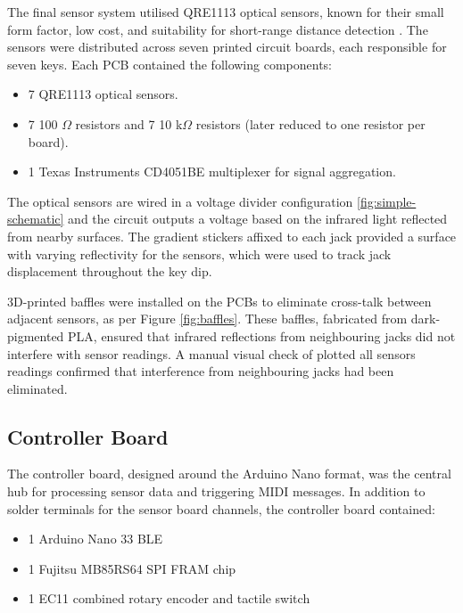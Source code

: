 The final sensor system utilised QRE1113 optical sensors, known for their small form factor, low cost, and suitability for short-range distance detection \cite{McPherson2013, McPherson2019}. The sensors were distributed across seven printed circuit boards, each responsible for seven keys. Each PCB contained the following components:

\begin{itemize}
    \item 7 QRE1113 optical sensors.
    \item 7 100 $\Omega$ resistors and 7 10 k$\Omega$ resistors (later reduced to one resistor per board).
    \item 1 Texas Instruments CD4051BE multiplexer for signal aggregation.
\end{itemize}

The optical sensors are wired in a voltage divider configuration \ref{fig:simple-schematic} and the circuit outputs a voltage based on the infrared light reflected from nearby surfaces. 
The gradient stickers affixed to each jack provided a surface with varying reflectivity for the sensors, which were used to track jack displacement throughout the key dip. 

3D-printed baffles were installed on the PCBs to eliminate cross-talk between adjacent sensors, as per Figure \ref{fig:baffles}. These baffles, fabricated from dark-pigmented PLA, ensured that infrared reflections from neighbouring jacks did not interfere with sensor readings. A manual visual check of plotted all sensors readings confirmed that interference from neighbouring jacks had been eliminated.

\subsection{Controller Board}\label{controller-board}

The controller board, designed around the Arduino Nano format, was the central hub for processing sensor data and triggering MIDI messages. In addition to solder terminals for the sensor board channels, the controller board contained:

\begin{itemize}
    \item 1 Arduino Nano 33 BLE
    \item 1 Fujitsu MB85RS64 SPI FRAM chip
    \item 1 EC11 combined rotary encoder and tactile switch
\end{itemize}

